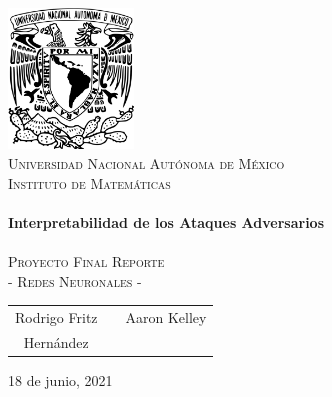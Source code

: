 \begin{titlepage}
    \begin{center}
    
    \includegraphics[width=0.25\textwidth]{resources/unam_escudo.png}~\\[0.2cm]
    \textsc{\huge Universidad Nacional Autónoma de México}\\[0.5cm]  
    \textsc{\LARGE Instituto de Matemáticas}\\[3cm]
    
    \HRule \\[0.5cm] 
    {\Huge \bfseries Interpretabilidad de los Ataques Adversarios} \\[0.3cm] 
    \HRule \\[0.5cm]
    
    \textsc{\LARGE Proyecto Final Reporte}\\[0.4cm]
    \textsc{\LARGE - Redes Neuronales - }\\[3cm]
    

    {\Large
    \begin{tabular}{ccc}
        Rodrigo Fritz & \hspace{1.5in} & Aaron Kelley \\
        Hern\'andez & \hspace{1.5in} & 
    \end{tabular}
    }
    \vfill

    {\Large 18 de junio, 2021}
    
    \end{center} 
    \end{titlepage}